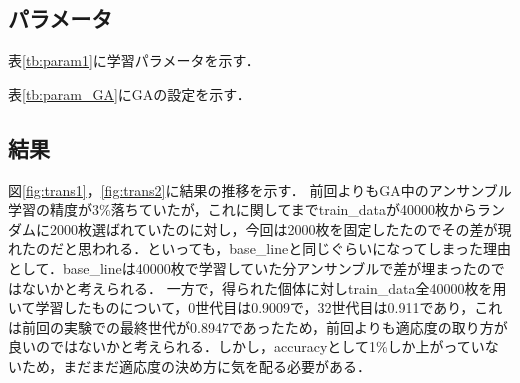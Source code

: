 \documentclass[twocolumn]{jarticle}     %
\begin{document}
\subsection{パラメータ}
表\ref{tb:param1}に学習パラメータを示す．
\begin{table}[h]
	\centering
	\caption{学習パラメータ\label{tb:param1}}
\end{table}
表\ref{tb:param_GA}にGAの設定を示す．
\begin{table}[h]
	\centering
	\caption{実験パラメータ\label{tb:param_GA}}
\end{table}

\subsection{結果}
図\ref{fig:trans1}，\ref{fig:trans2}に結果の推移を示す．
前回よりもGA中のアンサンブル学習の精度が3\%落ちていたが，これに関してまでtrain\_dataが40000枚からランダムに2000枚選ばれていたのに対し，今回は2000枚を固定したたのでその差が現れたのだと思われる．といっても，base\_lineと同じぐらいになってしまった理由として．base\_lineは40000枚で学習していた分アンサンブルで差が埋まったのではないかと考えられる．
一方で，得られた個体に対しtrain\_data全40000枚を用いて学習したものについて，0世代目は0.9009で，32世代目は0.911であり，これは前回の実験での最終世代が0.8947であったため，前回よりも適応度の取り方が良いのではないかと考えられる．しかし，accuracyとして1\%しか上がっていないため，まだまだ適応度の決め方に気を配る必要がある．
\\
\\
\end{document}
